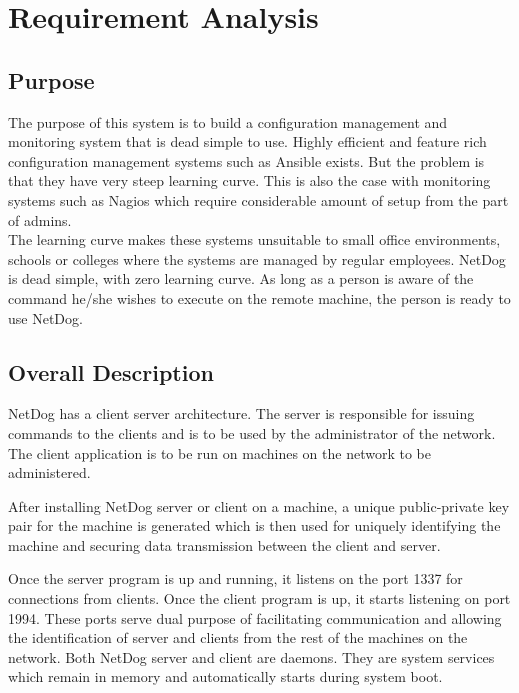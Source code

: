 \chapter{Requirement Analysis}

\section{Purpose}
\par
The purpose of this system is to build a configuration management and monitoring
system that is dead simple to use. Highly efficient and feature rich
configuration management systems such as Ansible exists. But the problem is that
they have very steep learning curve. This is also the case with monitoring
systems such as Nagios which require considerable amount of setup from the part
of admins. \\

The learning curve makes these systems unsuitable to small office environments,
schools or colleges where the systems are managed by regular employees. NetDog
is dead simple, with zero learning curve. As long as a person is aware of the
command he/she wishes to execute on the remote machine, the person is ready to
use NetDog. \\

\section{Overall Description}
\par
NetDog has a client server architecture. The server is responsible for issuing
commands to the clients and is to be used by the administrator of the network.
The client application is to be run on machines on the network to be
administered.

After installing NetDog server or client on a machine, a unique public-private
key pair for the machine is generated which is then used for uniquely
identifying the machine and securing data transmission between the client and
server.

Once the server program is up and running, it listens on the port 1337 for
connections from clients. Once the client program is up, it starts listening on
port 1994. These ports serve dual purpose of facilitating communication and
allowing the identification of server and clients from the rest of the machines
on the network. Both NetDog server and client are daemons. They are system 
services which remain in memory and automatically starts during system boot.

